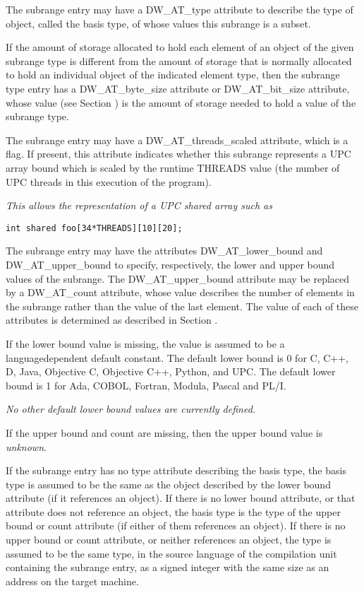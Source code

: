 The subrange entry may have a DW\_AT\_type attribute to describe
the type of object, called the basis type, of whose values
this subrange is a subset.

If the amount of storage allocated to hold each element of an
object of the given subrange type is different from the amount
of storage that is normally allocated to hold an individual
object of the indicated element type, then the subrange
type entry has a DW\_AT\_byte\_size attribute or DW\_AT\_bit\_size
attribute, whose value 
(see Section )
is the amount of
storage needed to hold a value of the subrange type.

The subrange entry may have a DW\_AT\_threads\_scaled attribute,
which is a flag. If present, this attribute indicates whether
this subrange represents a UPC array bound which is scaled
by the runtime THREADS value (the number of UPC threads in
this execution of the program).

\textit{This allows the representation of a UPC shared array such as}

\begin{lstlisting}
int shared foo[34*THREADS][10][20];
\end{lstlisting}

The subrange entry may have the attributes DW\_AT\_lower\_bound
and DW\_AT\_upper\_bound to specify, respectively, the lower
and upper bound values of the subrange. The DW\_AT\_upper\_bound
attribute may be replaced by a DW\_AT\_count attribute, whose
value describes the number of elements in the subrange rather
than the value of the last element. The value of each of
these attributes is determined as described in 
Section .

If the lower bound value is missing, the value is assumed to
be a language\dash dependent default constant. The default lower
bound is 0 for C, C++, D, Java, Objective C, Objective C++,
Python, and UPC. The default lower bound is 1 for Ada, COBOL,
Fortran, Modula, Pascal and PL/I.

\textit{No other default lower bound values are currently defined.}

If the upper bound and count are missing, then the upper bound value is 
\textit{unknown}.

If the subrange entry has no type attribute describing the
basis type, the basis type is assumed to be the same as
the object described by the lower bound attribute (if it
references an object). If there is no lower bound attribute,
or that attribute does not reference an object, the basis type
is the type of the upper bound or count attribute (if either
of them references an object). If there is no upper bound or
count attribute, or neither references an object, the type is
assumed to be the same type, in the source language of the
compilation unit containing the subrange entry, as a signed
integer with the same size as an address on the target machine.

